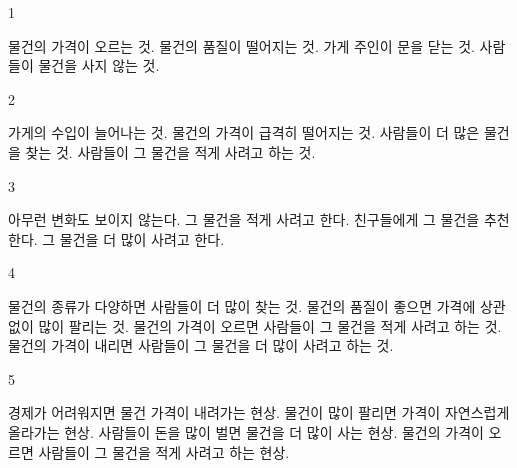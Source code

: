 \documentclass[fs9,seriesFre]{korfarm-base}
\begin{document}
\kfActivityBg \par{}
\par{}\par\nopagebreak[4]\smallskip\nopagebreak[4]
\kfBeginMC
\begin{kfSentenceUnit}{1}{}
\begin{kfChoices}
\kfChoice 물건의 가격이 오르는 것.
\kfChoice 물건의 품질이 떨어지는 것.
\kfChoice 가게 주인이 문을 닫는 것.
\kfChoice 사람들이 물건을 사지 않는 것.
\end{kfChoices}
\end{kfSentenceUnit}

\begin{kfSentenceUnit}{2}{}
\begin{kfChoices}
\kfChoice 가게의 수입이 늘어나는 것.
\kfChoice 물건의 가격이 급격히 떨어지는 것.
\kfChoice 사람들이 더 많은 물건을 찾는 것.
\kfChoice 사람들이 그 물건을 적게 사려고 하는 것.
\end{kfChoices}
\end{kfSentenceUnit}

\begin{kfSentenceUnit}{3}{}
\begin{kfChoices}
\kfChoice 아무런 변화도 보이지 않는다.
\kfChoice 그 물건을 적게 사려고 한다.
\kfChoice 친구들에게 그 물건을 추천한다.
\kfChoice 그 물건을 더 많이 사려고 한다.
\end{kfChoices}
\end{kfSentenceUnit}

\begin{kfSentenceUnit}{4}{}
\begin{kfChoices}
\kfChoice 물건의 종류가 다양하면 사람들이 더 많이 찾는 것.
\kfChoice 물건의 품질이 좋으면 가격에 상관없이 많이 팔리는 것.
\kfChoice 물건의 가격이 오르면 사람들이 그 물건을 적게 사려고 하는 것.
\kfChoice 물건의 가격이 내리면 사람들이 그 물건을 더 많이 사려고 하는 것.
\end{kfChoices}
\end{kfSentenceUnit}

\begin{kfSentenceUnit}{5}{}
\begin{kfChoices}
\kfChoice 경제가 어려워지면 물건 가격이 내려가는 현상.
\kfChoice 물건이 많이 팔리면 가격이 자연스럽게 올라가는 현상.
\kfChoice 사람들이 돈을 많이 벌면 물건을 더 많이 사는 현상.
\kfChoice 물건의 가격이 오르면 사람들이 그 물건을 적게 사려고 하는 현상.
\end{kfChoices}
\end{kfSentenceUnit}
\end{document}

